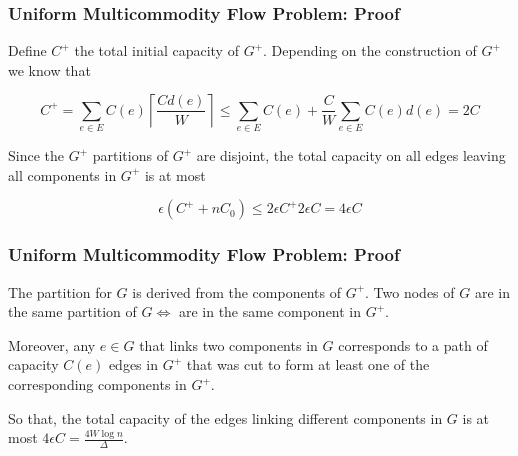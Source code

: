 \begin{frame}
\frametitle{Uniform Multicommodity Flow Problem: Proof}

Define $C^{+}$ the total initial capacity of $G^{+}$. Depending on the construction of $G^{+}$ we know that 

$$C^{+} = \sum_{e \in E} C(e)\left \lceil \frac{Cd(e)}{W} \right \rceil \leq \sum_{e \in E}C(e) + \frac{C}{W}\sum_{e \in E}C(e)d(e) = 2C$$

Since the $G^{+}$ partitions of $G^{+}$ are disjoint, the total capacity on all edges leaving all components in $G^{+}$ is at most

$$\epsilon(C^{+}+nC_0) \leq 2\epsilon C^{+} 2\epsilon C = 4\epsilon C$$
\end{frame}

\begin{frame}
\frametitle{Uniform Multicommodity Flow Problem: Proof}

The partition for $G$ is derived from the components of $G^{+}$. Two nodes of $G$ are in the same partition of $G \Leftrightarrow$ are in the same component in $G^{+}$.

Moreover, any $e \in G$ that links two components in $G$ corresponds to a path of capacity $C(e)$ edges in $G^{+}$ that was cut to form at least one of the corresponding components in $G^{+}$.

So that, the total capacity of the edges linking different components in $G$ is at most $4\epsilon C = \frac{4W\log n }{\Delta}$.

\end{frame}


